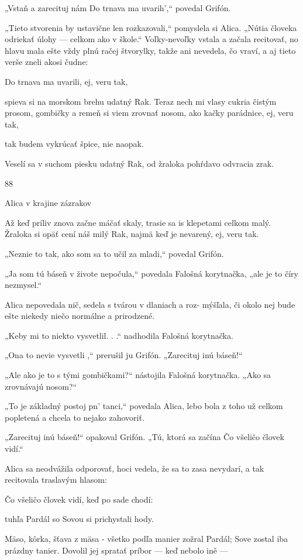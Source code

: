 \documentclass[12pt]{article}
\begin{document}
\begin{Parallel}[p]{}{}
{{„Vstaň a zarecituj nám Do trnava ma uvarih',“ povedal
Grifón.

„Tieto stvorenia by ustavične len rozkazovali,“ pomyslela
si Alica. „Nútia človeka odriekať úlohy — celkom ako
v škole.“ Voľky-nevoľky vstala a začala recitovať, no hlavu
mala ešte vždy plnú račej štvorylky, takže ani nevedela, čo
vraví, a aj tieto verše zneli akosi čudne:

Do trnava ma uvarili, ej, veru tak,

spieva si na morskom brehu udatný Rak.
Teraz nech mi vlasy cukria čistým prosom,
gombičky a remeň si viem zrovnať nosom,
ako kačky parádnice, ej, veru tak,

tak budem vykrúcať špice, nie naopak.

Veselí sa v suchom piesku udatný Rak,
od žraloka pohŕdavo odvracia zrak.

88

Alica v krajine zázrakov

Až keď príliv znova začne máčať skaly,
trasie sa is klepetami celkom malý.
Žraloka si opäť cení náš milý Rak,
najmä keď je nevarený, ej, veru tak.

„Neznie to tak, ako som sa to učil za mladi,“ povedal
Grifón.

„Ja som tú báseň v živote nepočula,“ povedala Falošná
korytnačka, „ale je to číry nezmysel.“

Alica nepovedala nič, sedela s tvárou v dlaniach a roz-
mýšľala, či okolo nej bude ešte niekedy niečo normálne
a prirodzené.

„Keby mi to niekto vysvetlil. . .“ nadhodila Falošná
korytnačka.

„Ona to nevie vysvetli ,“ prerušil ju Grifón. „Zarecituj
inú báseň!“

„Ale ako je to s tými gombičkami?“ nástojila Falošná
korytnačka. „Ako sa zrovnávajú nosom?“

„To je základný postoj pn' tanci,“ povedala Alica, lebo
bola z toho už celkom popletená a chcela to nejako
zahovoriť.

„Zarecituj inú báseň!“ opakoval Grifón. „Tú, ktorá sa
začína Čo všeličo človek vidí.“

Alica sa neodvážila odporovať, hoci vedela, že sa to zasa
nevydarí, a tak recitovala traslavým hlasom:

Čo všeličo človek vidí, keď po sade chodí:

tuhľa Pardál so Sovou si prichystali hody.

Mäso, kôrka, šťava z mäsa - všetko podľa manier
zožral Pardál; Sove zostal iba prázdny tanier.
Dovolil jej spratať príbor — keď nebolo ině —

}}
\end{Parallel}
\end{document}
